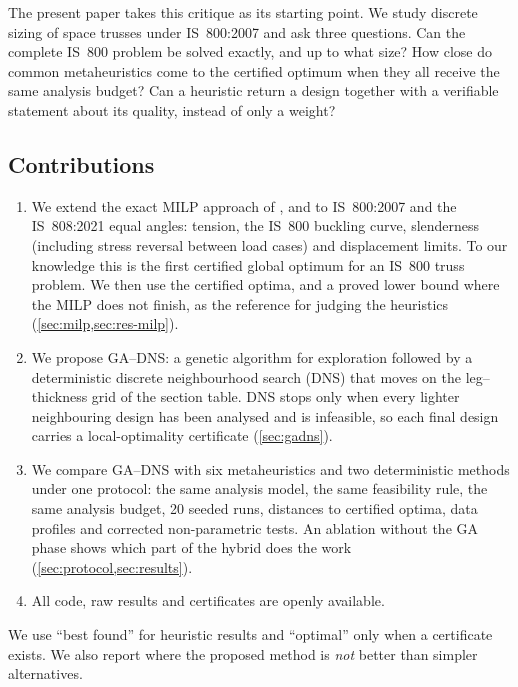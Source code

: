 \documentclass[lineno,pdflatex,sn-mathphys-num]{sn-jnl}
\begin{document}
The present paper takes this critique as its starting point. We study discrete
sizing of space trusses under IS~800:2007 and ask three questions. Can the
complete IS~800 problem be solved exactly, and up to what size? How close do
common metaheuristics come to the certified optimum when they all receive the
same analysis budget? Can a heuristic return a design together with a
verifiable statement about its quality, instead of only a weight?

\subsection{Contributions}
\label{sec:contrib}
\begin{enumerate}
  \item We extend the exact MILP approach of
        \citet{Rasmussen2008}, \citet{Mela2014} and \citet{VanMellaert2018} to
        IS~800:2007 and the IS~808:2021 equal angles: tension, the IS~800 buckling
        curve, slenderness (including stress reversal between load cases) and
        displacement limits. To our knowledge this is the first certified
        global optimum for an IS~800 truss problem. We then use the certified
        optima, and a proved lower bound where the MILP does not finish, as the
        reference for judging the heuristics (\cref{sec:milp,sec:res-milp}).
  \item We propose GA--DNS: a genetic algorithm for exploration followed by a
        deterministic discrete neighbourhood search (DNS) that moves on the
        leg--thickness grid of the section table. DNS stops only when every
        lighter neighbouring design has been analysed and is infeasible, so each
        final design carries a local-optimality certificate (\cref{sec:gadns}).
  \item We compare GA--DNS with six metaheuristics and two deterministic
        methods under one protocol: the same analysis model, the same
        feasibility rule, the same analysis budget, 20 seeded runs, distances
        to certified optima, data profiles and corrected non-parametric
        tests. An ablation without the GA phase shows which part of the
        hybrid does the work (\cref{sec:protocol,sec:results}).
  \item All code, raw results and certificates are openly available.
\end{enumerate}

We use ``best found'' for heuristic results and ``optimal'' only when a
certificate exists. We also report where the proposed method is \emph{not}
better than simpler alternatives.
\end{document}
